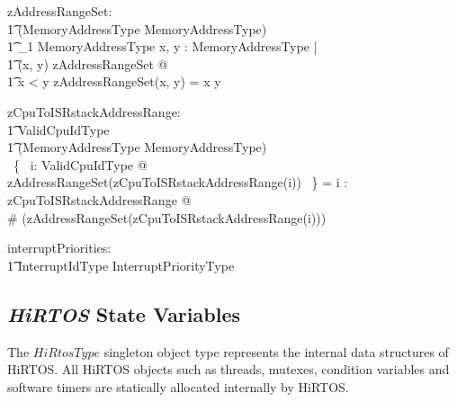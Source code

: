 \documentclass[11pt,letterpaper,twoside,openany]{book}
\begin{document}
\begin{axdef}
    zAddressRangeSet: \\
    \t1 (MemoryAddressType \cross MemoryAddressType) \inj \\
    \t1 \finset_1 MemoryAddressType
\where
    \forall x, y : MemoryAddressType | \\
   \t1  (x, y) \in \dom zAddressRangeSet @ \\
   \t1 x < y \land zAddressRangeSet(x, y) = x \upto y
\end{axdef}

\begin{axdef}
   zCpuToISRstackAddressRange: \\
   \t1 ValidCpuIdType \inj \\
   \t1 (MemoryAddressType \cross MemoryAddressType) \\
\where
   \bigcap~\{~ i: ValidCpuIdType @ \\
     zAddressRangeSet(zCpuToISRstackAddressRange(i)) ~\} = \emptyset
\also
   \forall i : \dom zCpuToISRstackAddressRange @ \\
      \# (zAddressRangeSet(zCpuToISRstackAddressRange(i))) 
\end{axdef}

\begin{axdef}
   interruptPriorities: \\
   \t1 InterruptIdType \fun InterruptPriorityType
\end{axdef}

\subsection{\emph{HiRTOS} State Variables}

The $HiRtosType$ singleton object type represents the internal data
structures of HiRTOS. All HiRTOS objects such as threads, mutexes,
condition variables and software timers are statically allocated
internally by HiRTOS.
\end{document}
